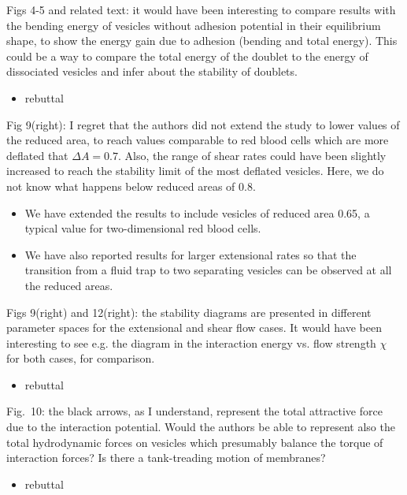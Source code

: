 \documentclass[11pt]{article}
\newcommand{\comment}[1]{{\color{blue} #1}}
\begin{document}
\noindent
\comment{Figs 4-5 and related text: it would have been interesting to
compare results with the bending energy of vesicles without adhesion
potential in their equilibrium shape, to show the energy gain due to
adhesion (bending and total energy). This could be a way to compare
the total energy of the doublet to the energy of dissociated vesicles
and infer about the stability of doublets.}
\begin{itemize}
  \item rebuttal
\end{itemize}

\noindent
\comment{Fig 9(right): I regret that the authors did not extend the study
to lower values of the reduced area, to reach values comparable to red
blood cells which are more deflated that $\Delta A=0.7$. Also, the range
of shear rates could have been slightly increased to reach the
stability limit of the most deflated vesicles. Here, we do not know
what happens below reduced areas of 0.8.}
\begin{itemize}
  \item We have extended the results to include vesicles of reduced area
    0.65, a typical value for two-dimensional red blood cells.
  \item We have also reported results for larger extensional rates so
    that the transition from a fluid trap to two separating vesicles can
    be observed at all the reduced areas.
\end{itemize}

\noindent
\comment{ Figs 9(right) and 12(right): the stability diagrams are presented
in different parameter spaces for the extensional and shear flow
cases. It would have been interesting to see e.g. the diagram in the
interaction energy vs. flow strength $\chi$ for both cases, for
comparison.}
\begin{itemize}
  \item rebuttal
\end{itemize}

\noindent
\comment{Fig.~10: the black arrows, as I understand, represent the total
attractive force due to the interaction potential. Would the authors
be able to represent also the total hydrodynamic forces on vesicles
which presumably balance the torque of interaction forces? Is there a
tank-treading motion of membranes?}
\begin{itemize}
  \item rebuttal
\end{itemize}
\end{document}
